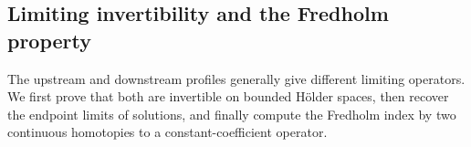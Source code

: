 \documentclass[12pt,letterpaper]{amsart}
\numberwithin{equation}{section}
\begin{document}
	
	
	
	
	
	
	
	
	
	
	
	
	
	
	
	
	
	
	
	
	
	
	
	
	
	
	
	
	
	
	
	
	
	
	
	
	
	
	
	
	
	
	
	
	
	
	
	
	
	
	
	
	\subsection{{Limiting invertibility and the Fredholm property}}
	{The upstream and downstream profiles generally give different limiting operators. We first prove that both are invertible on bounded H\"older spaces, then recover the endpoint limits of solutions, and finally compute the Fredholm index by two continuous homotopies to a constant-coefficient operator.}
	
\end{document}
